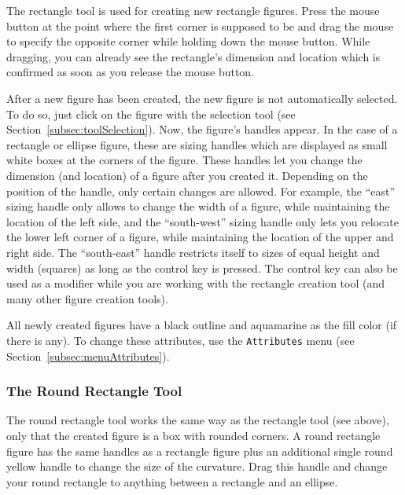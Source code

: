 The rectangle tool is used for creating new rectangle figures.
Press the mouse button at the point where the first corner is
supposed to be and drag the mouse to specify the opposite corner while
holding down the mouse button.
While dragging, you can already see the rectangle's dimension and location
which is confirmed as soon as you release the mouse button.

After a new figure has been created,
the new figure is not automatically selected.
To do so, just click on the figure with the selection tool
(see Section~\ref{subsec:toolSelection}).
Now, the figure's handles appear. In the case of a rectangle or ellipse
figure, these are sizing handles which are displayed as small white
boxes at the corners of the figure.
These handles let you change the dimension (and location) of a figure
after you created it.
Depending on the position of the handle, only certain changes are
allowed. For example, the ``east'' sizing handle only allows to change
the width of a figure, while maintaining the location of the left side,
and the ``south-west'' sizing handle only lets you relocate the lower
left corner of a figure, while maintaining the location of the upper and
right side.
The ``south-east'' handle restricts itself to sizes of
  equal height and width (squares) as long as the control key is pressed.
  The control key can also be used as a modifier while you are working with
  the rectangle creation tool (and many other figure creation tools).


All newly created figures have a black outline and aquamarine as the
fill color (if there is any).
To change these attributes, use the \texttt{Attributes} menu (see
Section~\ref{subsec:menuAttributes}).

\subsubsection{The Round Rectangle Tool}

The round rectangle tool works the same way as the rectangle tool (see above),
only that the created figure is a box with rounded corners.
A round rectangle figure has the same handles as a rectangle figure plus an
additional single round yellow handle to change the size of the curvature.
Drag this handle and change your round rectangle to anything between a
rectangle and an ellipse.

